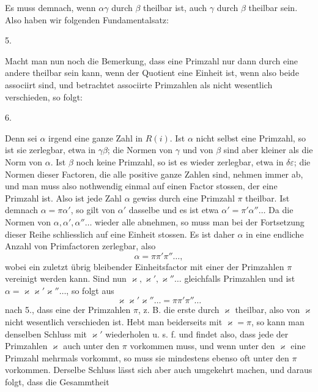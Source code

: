 Es muss demnach, wenn $\alpha\gamma$ durch $\beta$ theilbar ist, auch $\gamma$
durch $\beta$ theilbar sein. Also haben wir folgenden Fundamentalsatz:

5. 

Macht man nun noch die Bemerkung, dass eine Primzahl nur
dann durch eine andere theilbar sein kann, wenn der Quotient
eine Einheit ist, wenn also beide associirt sind, und betrachtet
associirte Primzahlen als nicht wesentlich verschieden, so folgt:

6. 

Denn sei $\alpha$ irgend eine ganze Zahl in $R(i)$. Ist $\alpha$ nicht
selbst eine Primzahl, so ist sie zerlegbar, etwa in $\gamma\beta$; die Normen
von $\gamma$ und von $\beta$ sind aber kleiner als die Norm von $\alpha$. Ist $\beta$
noch keine Primzahl, so ist es wieder zerlegbar, etwa in $\delta\varepsilon$; die
Normen dieser Factoren, die alle positive ganze Zahlen sind,
nehmen immer ab, und man muss also nothwendig einmal auf
einen Factor stossen, der eine Primzahl ist. Also ist jede Zahl $\alpha$
gewiss durch eine Primzahl $\pi$ theilbar. Ist demnach $\alpha = \pi\alpha'$,
so gilt von $\alpha'$ dasselbe und es ist etwa $\alpha' = \pi'\alpha'' \dots$ Da die
Normen von $\alpha, \alpha', \alpha'' \dots$ wieder alle abnehmen, so muss man
bei der Fortsetzung dieser Reihe schliesslich auf eine Einheit
stossen. Es ist daher $\alpha$ in eine endliche Anzahl von Primfactoren
zerlegbar, also
\[
\alpha = \pi\pi'\pi'' \dots,
\]
wobei ein zuletzt übrig bleibender Einheitsfactor mit einer der
Primzahlen $\pi$ vereinigt werden kann. Sind nun $\varkappa, \varkappa', \varkappa'' \dots$
gleichfalls Primzahlen und ist $\alpha = \varkappa\varkappa'\varkappa'' \dots$, so folgt aus
\[
\varkappa\varkappa'\varkappa'' \dots = \pi\pi'\pi'' \dots
\]
nach 5., dass eine der Primzahlen $\pi$, z. B. die erste durch $\varkappa$ theilbar,
also von $\varkappa$ nicht wesentlich verschieden ist. Hebt man
beiderseits mit $\varkappa = \pi$, so kann man denselben Schluss mit $\varkappa'$
wiederholen u. s. f. und findet also, dass jede der Primzahlen $\varkappa$
auch unter den $\pi$ vorkommen muss, und wenn unter den $\varkappa$ eine
Primzahl mehrmals vorkommt, so muss sie mindestens ebenso
oft unter den $\pi$ vorkommen. Derselbe Schluss lässt sich aber
auch umgekehrt machen, und daraus folgt, dass die Gesammtheit
